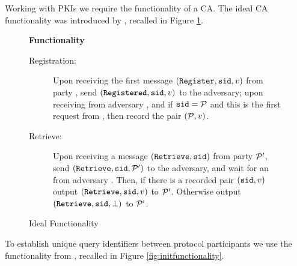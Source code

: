 \noindent
Working with \acp{PKI} we require the functionality of a \ac{CA}.
The ideal \ac{CA} functionality \Fca was introduced by \citet{Canetti04}, recalled in Figure \ref{fig:cafunctionality}.

\begin{figure}[h!]
\begin{mdframed}[innertopmargin=10pt]
\begin{center}
{\bf Functionality \Fca}
\end{center}

\begin{description}
	
	\item[Registration:] Upon receiving the first message $(\mathtt{Register}, \mathtt{sid}, v)$ from party \cP, send $(\mathtt{Registered}, \mathtt{sid}, v)$ to the adversary; upon receiving \ok from adversary \SIM, and if $\mathtt{sid}=\mathcal{P}$ and this is the first request from \cP, then record the pair $(\mathcal{P},v)$.
	
	\item[Retrieve:] Upon receiving a message $(\mathtt{Retrieve}, \mathtt{sid})$ from party $\mathcal{P}'$, send $(\mathtt{Retrieve}, \mathtt{sid}, \mathcal{P}')$ to the adversary, and wait for an \ok from adversary \SIM.
	            Then, if there is a recorded pair $(\mathtt{sid}, v)$ output $(\mathtt{Retrieve}, \mathtt{sid}, v)$ to $\mathcal{P}'$.
	            Otherwise output $(\mathtt{Retrieve}, \mathtt{sid}, \bot)$ to $\mathcal{P}'$.
	
\end{description}
\end{mdframed}
\caption{Ideal Functionality \Fca}
\label{fig:cafunctionality}
\end{figure}

\noindent
To establish unique query identifiers between protocol participants we use the \Finit functionality from \citet{BarakLR04}, recalled in Figure \ref{fig:initfunctionality}.

